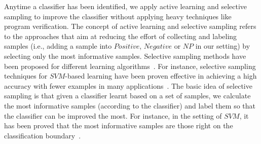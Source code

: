 Anytime a classifier has been identified, we apply active learning and selective sampling to improve the classifier without applying heavy techniques like program verification.
The concept of active learning and selective sampling refers to the approaches that aim at reducing the effort of collecting and labeling samples (i.e., adding a sample into $\mathit{Positive}$, $\mathit{Negative}$ or $\mathit{NP}$ in our setting) by selecting only the most informative samples. 
Selective sampling methods have been proposed for different learning algorithms~\cite{DBLP:conf/icml/OrabonaC11}.
For instance, selective sampling techniques for $\mathit{SVM}$-based learning have been proven effective in achieving a
high accuracy with fewer examples in many applications~\cite{DBLP:conf/icml/OrabonaC11,DBLP:conf/mm/TongC01,DBLP:journals/jmlr/TongK01}.
The basic idea of selective sampling is that given a classifier learnt based on a set of samples, we calculate the most informative samples (according to the classifier) and label them so that the classifier can be improved the most.
For instance, in the setting of $\mathit{SVM}$, it has been proved that the most informative samples are those right on the classification boundary~\cite{DBLP:conf/icml/OrabonaC11}.
